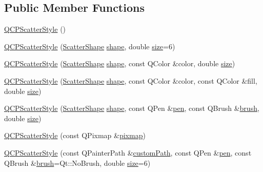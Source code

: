 \subsection*{Public Member Functions}
\begin{DoxyCompactItemize}
\item 
\hyperlink{class_q_c_p_scatter_style_a8836018d9ad83ccd8870de8315c1be73}{Q\+C\+P\+Scatter\+Style} ()
\item 
\hyperlink{class_q_c_p_scatter_style_a003d92f74f4561eda111862eadd62f28}{Q\+C\+P\+Scatter\+Style} (\hyperlink{class_q_c_p_scatter_style_adb31525af6b680e6f1b7472e43859349}{Scatter\+Shape} \hyperlink{class_q_c_p_scatter_style_a4462a25ef17769631f4e0aa81dadca4b}{shape}, double \hyperlink{class_q_c_p_scatter_style_a1973ee650368f1c5f55507b78473f634}{size}=6)
\item 
\hyperlink{class_q_c_p_scatter_style_afa059da858c864c7e05871dc602d7eab}{Q\+C\+P\+Scatter\+Style} (\hyperlink{class_q_c_p_scatter_style_adb31525af6b680e6f1b7472e43859349}{Scatter\+Shape} \hyperlink{class_q_c_p_scatter_style_a4462a25ef17769631f4e0aa81dadca4b}{shape}, const Q\+Color \&color, double \hyperlink{class_q_c_p_scatter_style_a1973ee650368f1c5f55507b78473f634}{size})
\item 
\hyperlink{class_q_c_p_scatter_style_a6e1b64f12cac7f07af180ae4316fd38d}{Q\+C\+P\+Scatter\+Style} (\hyperlink{class_q_c_p_scatter_style_adb31525af6b680e6f1b7472e43859349}{Scatter\+Shape} \hyperlink{class_q_c_p_scatter_style_a4462a25ef17769631f4e0aa81dadca4b}{shape}, const Q\+Color \&color, const Q\+Color \&fill, double \hyperlink{class_q_c_p_scatter_style_a1973ee650368f1c5f55507b78473f634}{size})
\item 
\hyperlink{class_q_c_p_scatter_style_a85acc4941d7e5c9bca5fa51377a77f49}{Q\+C\+P\+Scatter\+Style} (\hyperlink{class_q_c_p_scatter_style_adb31525af6b680e6f1b7472e43859349}{Scatter\+Shape} \hyperlink{class_q_c_p_scatter_style_a4462a25ef17769631f4e0aa81dadca4b}{shape}, const Q\+Pen \&\hyperlink{class_q_c_p_scatter_style_a3c24c3bf37b561b4807aed9f1418ab58}{pen}, const Q\+Brush \&\hyperlink{class_q_c_p_scatter_style_a46bf481d84bfa31b287dd43a3bf86d37}{brush}, double \hyperlink{class_q_c_p_scatter_style_a1973ee650368f1c5f55507b78473f634}{size})
\item 
\hyperlink{class_q_c_p_scatter_style_a63962094587a4c2258435aa7933996cc}{Q\+C\+P\+Scatter\+Style} (const Q\+Pixmap \&\hyperlink{class_q_c_p_scatter_style_a9bab44cc41fcd585621a4b3e0e48231b}{pixmap})
\item 
\hyperlink{class_q_c_p_scatter_style_a879c30647683b3cfbde2afecea815e6f}{Q\+C\+P\+Scatter\+Style} (const Q\+Painter\+Path \&\hyperlink{class_q_c_p_scatter_style_a4dd4998dfb0d6889205668a06c790328}{custom\+Path}, const Q\+Pen \&\hyperlink{class_q_c_p_scatter_style_a3c24c3bf37b561b4807aed9f1418ab58}{pen}, const Q\+Brush \&\hyperlink{class_q_c_p_scatter_style_a46bf481d84bfa31b287dd43a3bf86d37}{brush}=Qt\+::\+No\+Brush, double \hyperlink{class_q_c_p_scatter_style_a1973ee650368f1c5f55507b78473f634}{size}=6)

\end{DoxyCompactItemize}
